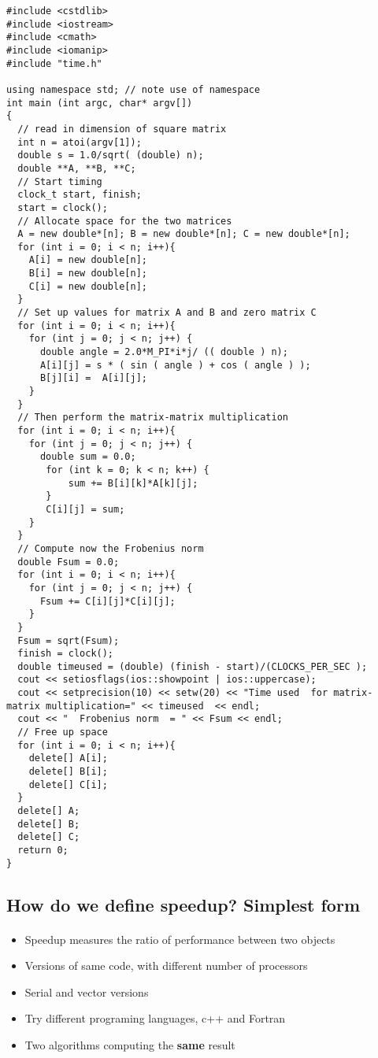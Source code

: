 \begin{verbatim}
#include <cstdlib>
#include <iostream>
#include <cmath>
#include <iomanip>
#include "time.h"

using namespace std; // note use of namespace
int main (int argc, char* argv[])
{
  // read in dimension of square matrix
  int n = atoi(argv[1]);
  double s = 1.0/sqrt( (double) n);
  double **A, **B, **C;
  // Start timing
  clock_t start, finish;
  start = clock();
  // Allocate space for the two matrices
  A = new double*[n]; B = new double*[n]; C = new double*[n];
  for (int i = 0; i < n; i++){
    A[i] = new double[n];
    B[i] = new double[n];
    C[i] = new double[n];
  }
  // Set up values for matrix A and B and zero matrix C
  for (int i = 0; i < n; i++){
    for (int j = 0; j < n; j++) {
      double angle = 2.0*M_PI*i*j/ (( double ) n);
      A[i][j] = s * ( sin ( angle ) + cos ( angle ) );
      B[j][i] =  A[i][j];
    }
  }
  // Then perform the matrix-matrix multiplication
  for (int i = 0; i < n; i++){
    for (int j = 0; j < n; j++) {
      double sum = 0.0;
       for (int k = 0; k < n; k++) {
           sum += B[i][k]*A[k][j];
       }
       C[i][j] = sum;
    }
  }
  // Compute now the Frobenius norm
  double Fsum = 0.0;
  for (int i = 0; i < n; i++){
    for (int j = 0; j < n; j++) {
      Fsum += C[i][j]*C[i][j];
    }
  }
  Fsum = sqrt(Fsum);
  finish = clock();
  double timeused = (double) (finish - start)/(CLOCKS_PER_SEC );
  cout << setiosflags(ios::showpoint | ios::uppercase);
  cout << setprecision(10) << setw(20) << "Time used  for matrix-matrix multiplication=" << timeused  << endl;
  cout << "  Frobenius norm  = " << Fsum << endl;
  // Free up space
  for (int i = 0; i < n; i++){
    delete[] A[i];
    delete[] B[i];
    delete[] C[i];
  }
  delete[] A;
  delete[] B;
  delete[] C;
  return 0;
}

\end{verbatim}


\subsection*{How do we define speedup? Simplest form}

\paragraph{}
\begin{itemize}
\item Speedup measures the ratio of performance between two objects

\item Versions of same code, with different number of processors

\item Serial and vector versions

\item Try different programing languages, c++ and Fortran

\item Two algorithms computing the \textbf{same} result 
\end{itemize}

